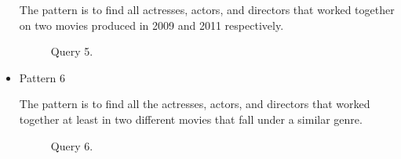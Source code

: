 \begin{itemize}
The pattern is to find all actresses, actors, and directors that worked together on two movies produced in 2009 and 2011 respectively.


\begin{figure}[t]
\centering
{}
\caption{Query 5.}
\label{fig:query5}
\centering
\end{figure}

\item Pattern 6

The pattern is to find all the actresses, actors, and directors that worked together at least in two different movies that fall under a similar genre.


\begin{figure}[t]
\centering
{}
\caption{Query 6.}
\label{fig:query6}
\centering
\end{figure}

\end{itemize}
